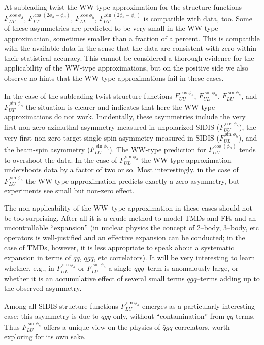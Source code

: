 \documentclass[a4paper,11pt]{article}
\begin{document}
At subleading twist the WW-type approximation for the
structure functions
	$F_{LT}^{\cos\phi_S}$,
	$F_{LT}^{\cos(2\phi_h-\phi_S)}$,
	$F_{LL}^{\cos\phi_h}$,
	$F_{UT}^{\sin(2\phi_h-\phi_S)}$
is compatible with data, too. Some of these asymmetries are
predicted to be very small in the WW-type approximation,
sometimes smaller than a fraction of a percent. This is
compatible with the available data in the sense that the
data are consistent with zero within their statistical
accuracy. This cannot be considered a thorough evidence
for the applicability of the WW-type approximations, but
on the positive side we also observe no hints
that the WW-type approximations fail in these cases.

In the case of the subleading-twist structure functions
	$F_{UU}^{\cos\phi_h}$,
	$F_{UL}^{\sin\phi_h}$,
	$F_{LU}^{\sin\phi_h}$, and
	$F_{UT}^{\sin\phi_S}$
the situation is clearer and indicates that here the WW-type
approximations do not work.
Incidentally, these asymmetries include the very first non-zero azimuthal
asymmetry measured in unpolarized SIDIS ($F_{UU}^{\cos\phi_h}$),
the very first non-zero target single-spin asymmetry measured in SIDIS
($F_{UL}^{\sin\phi_h}$), and the beam-spin asymmetry ($F_{LU}^{\sin\phi_h}$).
The WW-type prediction for $F_{UU}^{\cos(\phi_h)}$ tends to overshoot
the data. In the case of $F_{UL}^{\sin\phi_h}$ the WW-type approximation
undershoots data by a factor of two or so.
Most interestingly, in the case of $F_{LU}^{\sin\phi_h}$ the WW-type
approximation predicts exactly a zero asymmetry, but experiments
see small but non-zero effect.

The non-applicability of the WW--type approximation in these 
cases should not be too surprising. After all it is a crude method
to model TMDs and FFs and an uncontrollable ``expansion''
(in nuclear physics the concept of 2--body, 3--body, etc operators
is well-justified and an effective expansion can be conducted; in
the case of TMDs, however, it is less appropriate to speak about a
systematic expansion in terms of $\bar{q}q$, $\bar{q}gq$, etc
correlators). It will be very interesting to learn whether, e.g.,
in $F_{UL}^{\sin\phi_h}$ or $F_{LU}^{\sin\phi_h}$ a single $\bar{q}gq$--term
is anomalously large, or whether it is an accumulative effect of
several small terms $\bar{q}gq$--terms adding up to the observed asymmetry.

Among all SIDIS structure functions $F_{LU}^{\sin\phi_h}$ emerges as
a particularly interesting case: this asymmetry is due to $\bar{q}gq$
only, without ``contamination'' from $\bar{q}q$ terms.
Thus $F_{LU}^{\sin\phi_h}$ offers a unique view on the physics of $\bar{q}gq$
correlators, worth exploring for its own sake.
\end{document}
